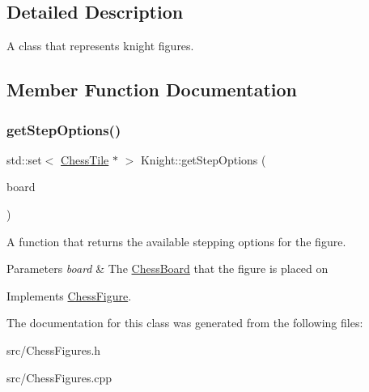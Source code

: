 \subsection{Detailed Description}
A class that represents knight figures. 

\subsection{Member Function Documentation}
\mbox{\label{classKnight_abb638cd75748653ec35365a77d528c42}} 
\subsubsection{\texorpdfstring{get\+Step\+Options()}{getStepOptions()}}
{\footnotesize\ttfamily std\+::set$<$ \mbox{\hyperlink{classChessTile}{Chess\+Tile}} $\ast$ $>$ Knight\+::get\+Step\+Options (\begin{DoxyParamCaption}\item[{\mbox{\hyperlink{classChessBoard}{Chess\+Board}} \&}]{board }\end{DoxyParamCaption})\hspace{0.3cm}{\ttfamily [virtual]}}



A function that returns the available stepping options for the figure. 


\begin{DoxyParams}{Parameters}
{\em board} & The \mbox{\hyperlink{classChessBoard}{Chess\+Board}} that the figure is placed on \\
\hline
\end{DoxyParams}


Implements \mbox{\hyperlink{classChessFigure_ae78d52e35c4ea926f492d211c69758bd}{Chess\+Figure}}.



The documentation for this class was generated from the following files\+:\begin{DoxyCompactItemize}
\item 
src/Chess\+Figures.\+h\item 
src/Chess\+Figures.\+cpp\end{DoxyCompactItemize}

